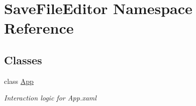 \hypertarget{namespace_save_file_editor}{}\section{Save\+File\+Editor Namespace Reference}
\label{namespace_save_file_editor}
\subsection*{Classes}
\begin{DoxyCompactItemize}
\item 
class \hyperlink{class_save_file_editor_1_1_app}{App}
\begin{DoxyCompactList}\small\item\em Interaction logic for App.\+xaml \end{DoxyCompactList}\end{DoxyCompactItemize}
